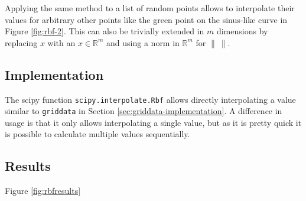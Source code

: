 Applying the same method to a list of random points allows to interpolate their values for arbitrary other points like the green point on the sinus-like curve in Figure \ref{fig:rbf-2}. This can also be trivially extended in $m$ dimensions by replacing $x$ with an $x\in\mathbb{R}^m$ and using a norm in $\mathbb{R}^m$ for $\left\|\ \right\|$.

\subsection{Implementation}

The scipy function \texttt{scipy.interpolate.Rbf} allows directly interpolating a value similar to \texttt{griddata} in Section \ref{sec:griddata-implementation}. A difference in usage is that it only allows interpolating a single value, but as it is pretty quick it is possible to calculate multiple values sequentially.

\subsection{Results}

Figure \ref{fig:rbfresults} 

